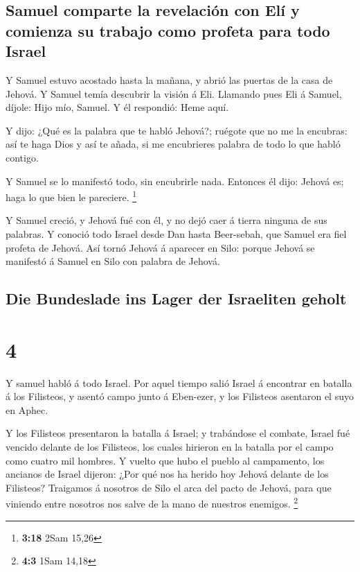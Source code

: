 \hypertarget{samuel-comparte-la-revelaciuxf3n-con-eluxed-y-comienza-su-trabajo-como-profeta-para-todo-israel}{%
\subsection{Samuel comparte la revelación con Elí y comienza su trabajo
como profeta para todo
Israel}\label{samuel-comparte-la-revelaciuxf3n-con-eluxed-y-comienza-su-trabajo-como-profeta-para-todo-israel}}

 Y Samuel estuvo acostado hasta la mañana, y abrió las
puertas de la casa de Jehová. Y Samuel temía descubrir la visión á Eli.
 Llamando pues Eli á Samuel, díjole: Hijo mío, Samuel. Y él
respondió: Heme aquí.

 Y dijo: ¿Qué es la palabra que te habló Jehová?; ruégote
que no me la encubras: así te haga Dios y así te añada, si me
encubrieres palabra de todo lo que habló contigo.

 Y Samuel se lo manifestó todo, sin encubrirle nada.
Entonces él dijo: Jehová es; haga lo que bien le pareciere. \footnote{\textbf{3:18}
  2Sam 15,26}

 Y Samuel creció, y Jehová fué con él, y no dejó caer á
tierra ninguna de sus palabras.  Y conoció todo Israel
desde Dan hasta Beer-sebah, que Samuel era fiel profeta de Jehová.
 Así tornó Jehová á aparecer en Silo: porque Jehová se
manifestó á Samuel en Silo con palabra de Jehová.

\hypertarget{die-bundeslade-ins-lager-der-israeliten-geholt}{%
\subsection{Die Bundeslade ins Lager der Israeliten
geholt}\label{die-bundeslade-ins-lager-der-israeliten-geholt}}

\hypertarget{section-3}{%
\section{4}\label{section-3}}

 Y samuel habló á todo Israel. Por aquel tiempo salió Israel
á encontrar en batalla á los Filisteos, y asentó campo junto á
Eben-ezer, y los Filisteos asentaron el suyo en Aphec.

 Y los Filisteos presentaron la batalla á Israel; y
trabándose el combate, Israel fué vencido delante de los Filisteos, los
cuales hirieron en la batalla por el campo como cuatro mil hombres.
 Y vuelto que hubo el pueblo al campamento, los ancianos de
Israel dijeron: ¿Por qué nos ha herido hoy Jehová delante de los
Filisteos? Traigamos á nosotros de Silo el arca del pacto de Jehová,
para que viniendo entre nosotros nos salve de la mano de nuestros
enemigos. \footnote{\textbf{4:3} 1Sam 14,18}

